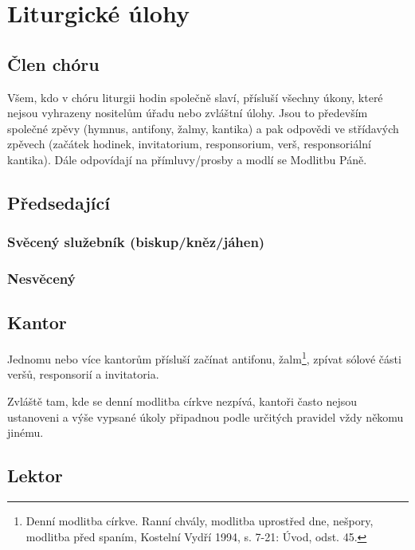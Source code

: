 \section{Liturgické úlohy}


\subsection{Člen chóru}

Všem, kdo v chóru liturgii hodin společně slaví, přísluší všechny úkony,
které nejsou vyhrazeny nositelům úřadu nebo zvláštní úlohy.
Jsou to především společné zpěvy 
(hymnus, antifony, žalmy, kantika)
a pak odpovědi ve střídavých zpěvech (začátek hodinek, invitatorium,
responsorium, verš, responsoriální kantika).
Dále odpovídají na přímluvy/prosby a modlí se Modlitbu Páně.

\subsection{Předsedající}
\subsubsection{Svěcený služebník (biskup/kněz/jáhen)}
\subsubsection{Nesvěcený}

\subsection{Kantor}

Jednomu nebo více kantorům přísluší 
začínat antifonu, žalm\footnote{Denní modlitba církve. Ranní chvály, modlitba uprostřed dne, nešpory, modlitba před spaním, Kostelní Vydří 1994, s. 7-21: Úvod, odst. 45.},
zpívat sólové části veršů, responsorií a invitatoria.

Zvláště tam, kde se denní modlitba církve nezpívá, kantoři často
nejsou ustanoveni a výše vypsané úkoly připadnou podle určitých pravidel
vždy někomu jinému. 

\subsection{Lektor}

